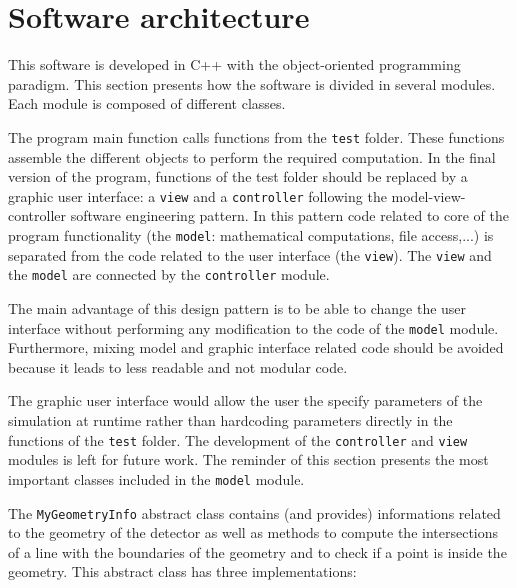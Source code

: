\documentclass[11pt]{article}
\begin{document}
\section{Software architecture}

This software is developed in C++ with the object-oriented programming paradigm.
This section presents how the software is divided in several modules. Each module
is composed of different classes.

The program main function calls functions from the \texttt{test} folder. These functions
assemble the different objects to perform the required computation. In the
final version of the program, functions of the test folder should be replaced
by a graphic user interface: a \texttt{view} and a \texttt{controller} following
the model-view-controller software engineering pattern. In this pattern code
related to core of the program functionality (the \texttt{model}: mathematical computations, file access,...)
is separated from the code related to the user interface (the \texttt{view}).
The \texttt{view} and the
\texttt{model} are connected by the \texttt{controller} module.

The main advantage of this design pattern is to be able to change the user interface without
performing any modification to the code of the \texttt{model} module. Furthermore,
mixing model and graphic interface related code should be avoided because it leads to
less readable and not modular code.

The graphic user interface would allow the user the specify
parameters of the simulation at runtime rather than hardcoding parameters
directly in the functions of the \texttt{test} folder.
The development of the \texttt{controller} and \texttt{view} modules
is left for future work. The reminder of this section presents the most important classes
included in the \texttt{model} module.

The \texttt{MyGeometryInfo} abstract class contains (and provides) informations
related to the
geometry of the detector as well as methods to compute the intersections of a
line with the boundaries of the geometry and to check if a point is inside
the geometry. This abstract class has three implementations:
\end{document}
